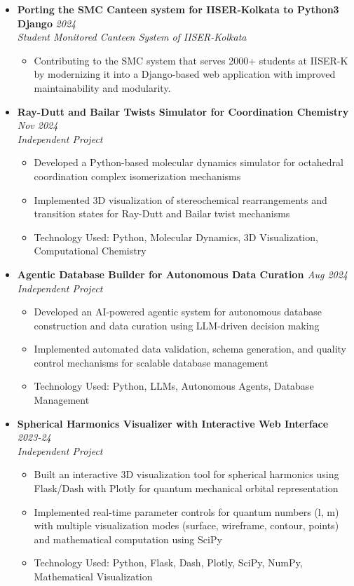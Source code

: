 \documentclass[a4paper,9pt]{article}
\newcommand{\resumeProject}[4]{
    \item\small{
        \textbf{#1} \hfill \textit{#2}\\
        \textit{#3}\\
        \begin{itemize}[leftmargin=1.5em,label=\textbullet,nosep,itemsep=0.5pt]
            #4
        \end{itemize}
    }\vspace{2pt}
}
\begin{document}
{\begin{itemize}[leftmargin=*,label={},itemsep=4pt]
    \resumeProject{Porting the SMC Canteen system for IISER-Kolkata to Python3 Django}{2024}
    {Student Monitored Canteen System of IISER-Kolkata}
    {\item Contributing to the SMC system that serves 2000+ students at IISER-K by modernizing it into a Django-based web application with improved maintainability and modularity.}

    \resumeProject{Ray-Dutt and Bailar Twists Simulator for Coordination Chemistry \href{https://github.com/Shuvam-Banerji-Seal/Ray-Dutt-and-Bailar-Twists-Simulator}{\faGithub}}{Nov 2024}
    {Independent Project}
    {\item Developed a Python-based molecular dynamics simulator for octahedral coordination complex isomerization mechanisms
    \item Implemented 3D visualization of stereochemical rearrangements and transition states for Ray-Dutt and Bailar twist mechanisms
    \item Technology Used: Python, Molecular Dynamics, 3D Visualization, Computational Chemistry}
     
    \resumeProject{Agentic Database Builder for Autonomous Data Curation \href{https://github.com/Shuvam-Banerji-Seal/Agentic_Database_Builder}{\faGithub}}{Aug 2024}
    {Independent Project}
    {\item Developed an AI-powered agentic system for autonomous database construction and data curation using LLM-driven decision making
    \item Implemented automated data validation, schema generation, and quality control mechanisms for scalable database management
    \item Technology Used: Python, LLMs, Autonomous Agents, Database Management}
     
    \resumeProject{Spherical Harmonics Visualizer with Interactive Web Interface \href{https://github.com/Shuvam-Banerji-Seal/simple-spherical-harmonics-visualizer}{\faGithub}}{2023-24}
    {Independent Project}
    {\item Built an interactive 3D visualization tool for spherical harmonics using Flask/Dash with Plotly for quantum mechanical orbital representation
    \item Implemented real-time parameter controls for quantum numbers (l, m) with multiple visualization modes (surface, wireframe, contour, points) and mathematical computation using SciPy
    \item Technology Used: Python, Flask, Dash, Plotly, SciPy, NumPy, Mathematical Visualization}
     
     

\end{itemize}
}
\end{document}
